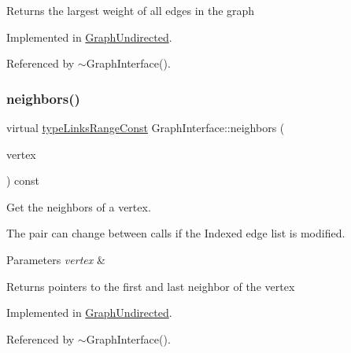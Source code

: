 \begin{DoxyReturn}{Returns}
the largest weight of all edges in the graph 
\end{DoxyReturn}


Implemented in \hyperlink{classGraphUndirected_a7c21f40748eef95d1c35be892ab10ce2}{Graph\+Undirected}.



Referenced by $\sim$\+Graph\+Interface().

\mbox{\label{classGraphInterface_afd5cdff5531b27fca35b58904d757db6}} 
\subsubsection{\texorpdfstring{neighbors()}{neighbors()}}
{\footnotesize\ttfamily virtual \hyperlink{graphInterface_8h_ae8d27008f15586bbf419af7ad2e0a48a}{type\+Links\+Range\+Const} Graph\+Interface\+::neighbors (\begin{DoxyParamCaption}\item[{const \hyperlink{edge_8h_a5fbd20c46956d479cb10afc9855223f6}{type\+Vertex} \&}]{vertex }\end{DoxyParamCaption}) const\hspace{0.3cm}{\ttfamily [pure virtual]}}



Get the neighbors of a vertex. 

The pair can change between calls if the Indexed edge list is modified. 
\begin{DoxyParams}{Parameters}
{\em vertex} & \\
\hline
\end{DoxyParams}
\begin{DoxyReturn}{Returns}
pointers to the first and last neighbor of the vertex 
\end{DoxyReturn}


Implemented in \hyperlink{classGraphUndirected_ad9058dbbd7e6d2930a6a233e8b6b0547}{Graph\+Undirected}.



Referenced by $\sim$\+Graph\+Interface().

\mbox{\label{classGraphInterface_a07f96d04c5481c6f573f478add5f7162}} 
